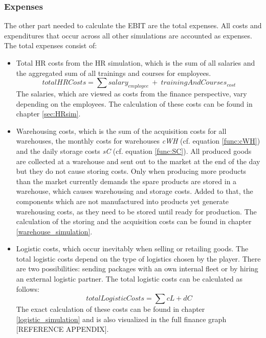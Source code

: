 \subsubsection{Expenses}
The other part needed to calculate the EBIT are the total expenses. All costs and expenditures that occur across all other simulations are accounted as expenses. The total expenses consist of:
\begin{itemize}
    \item Total HR costs from the HR simulation, which is the sum of all salaries and the aggregated sum of all trainings and courses for employees. 
    \begin{equation}
        totalHRCosts = \sum salary_{employee} \ + \  trainingAndCourses_{cost}
    \end{equation}
    The salaries, which are viewed as costs from the finance perspective, vary depending on the employees. The calculation of these costs can be found in chapter \ref{sec:HRsim}.
    \item Warehousing costs, which is the sum of the acquisition costs %
    for all warehouses, the monthly costs for warehouses \textit{cWH} (cf. equation \ref{func:cWH}) and the daily storage costs \textit{sC} (cf. equation \ref{func:SC}). All produced goods are collected at a warehouse and sent out to the market at the end of the day but they do not cause storing costs. Only when producing more products than the market currently demands the spare products are stored in a warehouse, which causes warehousing and storage costs. Added to that, the components which are not manufactured into products yet generate warehousing costs, as they need to be stored until ready for production. The calculation of the storing and the acquisition costs can be found in chapter \ref{warehouse_simulation}. 
    \item Logistic costs, which occur inevitably when selling or retailing goods. The total logistic costs depend on the type of logistics chosen by the player. There are two possibilities: sending packages with an own internal fleet or by hiring an external logistic partner. The total logistic costs can be calculated as follows:
    \begin{equation}
        totalLogisticCosts = \sum cL + dC
    \end{equation}
    The exact calculation of these costs can be found in chapter \ref{logistic_simulation} and is also visualized in the full finance graph [REFERENCE APPENDIX].

\end{itemize}
